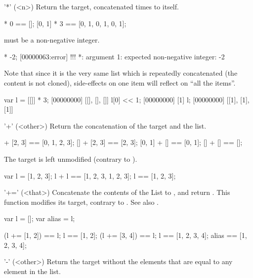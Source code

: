\begin{urbiscriptapi}
\item['*'](<n>)%
  Return the target, concatenated  times to itself.
\begin{urbiassert}
[0, 1] * 0 == [];
[0, 1] * 3 == [0, 1, 0, 1, 0, 1];
\end{urbiassert}

   must be a non-negative integer.

\begin{urbiscript}
[0, 1] * -2;
[00000063:error] !!! *: argument 1: expected non-negative integer: -2
\end{urbiscript}


  Note that since it is the very same list which is repeatedly
  concatenated (the content is not cloned), side-effects on one item
  will reflect on ``all the items''.

\begin{urbiscript}
var l = [[]] * 3;
[00000000] [[], [], []]
l[0] << 1;
[00000000] [1]
l;
[00000000] [[1], [1], [1]]
\end{urbiscript}

\item['+'](<other>)%
  Return the concatenation of the target and the  list.

\begin{urbiassert}
[0, 1] + [2, 3] == [0, 1, 2, 3];
    [] + [2, 3] == [2, 3];
[0, 1] + []     == [0, 1];
    [] + []     == [];
\end{urbiassert}

The target is left unmodified (contrary to ).
\begin{urbiassert}
var l = [1, 2, 3];
l + l == [1, 2, 3, 1, 2, 3];
l     == [1, 2, 3];
\end{urbiassert}

\item['+='](<that>)%
  Concatenate the contents of the List  to \this, and return
  \this.  This function modifies its target, contrary to .  See
  also .

\begin{urbiassert}
var l = [];
var alias = l;

(l += [1, 2]) == l;
l == [1, 2];
(l += [3, 4]) == l;
l == [1, 2, 3, 4];
alias == [1, 2, 3, 4];
\end{urbiassert}

\item['-'](<other>)%
  Return the target without the elements that are equal to any element
  in the  list.


\end{urbiscriptapi}

